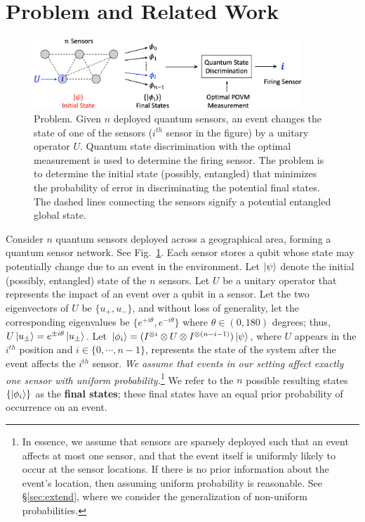 \section{\iso Problem and Related Work}
\label{sec:tqc_problem}

\begin{figure}[ht]
    \centering
    \includegraphics[width=0.9\textwidth]{chapters/tqc/figures/ISO.png}
    \caption{\iso Problem. Given $n$ deployed quantum sensors, an event changes the state of one of the sensors  ($i^{th}$ sensor in the figure) by a unitary operator $U$. Quantum state discrimination with the optimal measurement is used to determine the firing sensor. The \iso problem is to determine the initial state (possibly, entangled) that minimizes the probability of error in discriminating the potential final states. The dashed lines connecting the sensors signify a potential entangled global state.
    } 
    \label{fig:qsn}
\end{figure}

 Consider $n$ quantum sensors deployed across a geographical area, forming a quantum sensor network. See Fig.~\ref{fig:qsn}. 
Each sensor stores a qubit whose state may potentially change due to an event in the environment.
Let $\ket{\psi}$ denote the initial (possibly, entangled) state of the $n$ sensors.
Let $U$ be a unitary operator that represents the impact of an event over a qubit in a sensor.
Let the two eigenvectors 
of $U$ be $\{u_+, u_-\}$, and without loss of generality,
let the corresponding eigenvalues be $\{e^{+i\theta}, e^{-i\theta}\}$
where $\theta \in (0, 180)$ degrees;
thus, $U\ket{u_{\pm}}=e^{\pm i\theta}\ket{u_{\pm}}$.
Let $\ket{\phi_i} = (I^{\otimes i} \otimes U \otimes I^{\otimes (n-i-1)})\ket{\psi}$, 
where $U$ appears in the $i^{th}$ 
position and $i\in \{0, \cdots, n-1 \}$, 
represents the state of the system after the event affects the $i^{th}$ sensor. 
{\em We assume that events in our setting affect exactly one sensor with uniform probability.}\footnote{In essence, we assume that sensors are sparsely deployed such that
an event affects at most one sensor, and that the event itself is uniformly likely to occur at the
sensor locations. 
If there is no prior information about the event's location, then assuming uniform probability is reasonable.
See \S\ref{sec:extend}, where we consider the generalization of non-uniform probabilities.}  
We refer to the $n$ possible resulting states $\{\ket{\phi_i}\}$ as the {\bf final states}; these
final states have an equal prior probability of occurrence on an event.

